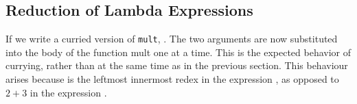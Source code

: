 \subsection{Reduction of Lambda Expressions}\label{subsec:Lambda_Expression_Reduction}
If we write a curried version of \texttt{mult}, .
The two arguments are now substituted into the body of the function mult one at a time.
This is the expected behavior of currying, rather than at the same time as in the previous section.
This behaviour arises because  is the leftmost innermost redex in the expression , as opposed to $2+3$ in the expression .


